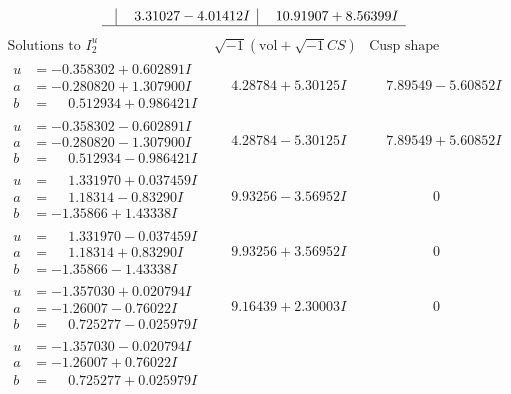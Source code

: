 \documentclass[1p]{elsarticle_modified}
\theoremstyle{definition}
\newcommand{\I}{\sqrt{-1}}
\begin{document}
$$\begin{array}{c|c|c}
 & \phantom{-}3.31027 - 4.01412 I & \phantom{-}10.91907 + 8.56399 I\\
 \hline 
 \end{array}$$\newpage$$\begin{array}{c|c|c}  
\text{Solutions to }I^u_{2}& \I (\text{vol} + \sqrt{-1}CS) & \text{Cusp shape}\\
 \hline 
\begin{aligned}
u &= -0.358302 + 0.602891 I \\
a &= -0.280820 + 1.307900 I \\
b &= \phantom{-}0.512934 + 0.986421 I\end{aligned}
 & \phantom{-}4.28784 + 5.30125 I & \phantom{-}7.89549 - 5.60852 I \\ \hline\begin{aligned}
u &= -0.358302 - 0.602891 I \\
a &= -0.280820 - 1.307900 I \\
b &= \phantom{-}0.512934 - 0.986421 I\end{aligned}
 & \phantom{-}4.28784 - 5.30125 I & \phantom{-}7.89549 + 5.60852 I \\ \hline\begin{aligned}
u &= \phantom{-}1.331970 + 0.037459 I \\
a &= \phantom{-}1.18314 - 0.83290 I \\
b &= -1.35866 + 1.43338 I\end{aligned}
 & \phantom{-}9.93256 - 3.56952 I & \phantom{-0.000000 } 0 \\ \hline\begin{aligned}
u &= \phantom{-}1.331970 - 0.037459 I \\
a &= \phantom{-}1.18314 + 0.83290 I \\
b &= -1.35866 - 1.43338 I\end{aligned}
 & \phantom{-}9.93256 + 3.56952 I & \phantom{-0.000000 } 0 \\ \hline\begin{aligned}
u &= -1.357030 + 0.020794 I \\
a &= -1.26007 - 0.76022 I \\
b &= \phantom{-}0.725277 - 0.025979 I\end{aligned}
 & \phantom{-}9.16439 + 2.30003 I & \phantom{-0.000000 } 0 \\ \hline\begin{aligned}
u &= -1.357030 - 0.020794 I \\
a &= -1.26007 + 0.76022 I \\
b &= \phantom{-}0.725277 + 0.025979 I\end{aligned}

\end{array}$$
\end{document}
